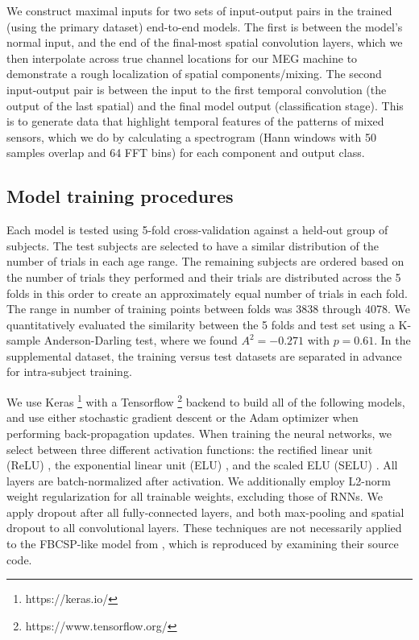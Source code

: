\documentclass[utf8]{frontiersSCNS} %
\begin{document}
We construct maximal inputs for two sets of input-output pairs in the trained (using the primary dataset) end-to-end models. The first is between the model's normal input, and the end of the final-most spatial convolution layers, which we then interpolate across true channel locations for our MEG machine to demonstrate a rough localization of spatial components/mixing. The second input-output pair is between the input to the first temporal convolution (the output of the last spatial) and the final model output (classification stage). This is to generate data that highlight temporal features of the patterns of mixed sensors, which we do by calculating a spectrogram (Hann windows with 50 samples overlap and 64 FFT bins) for each component and output class.

\subsection{Model training procedures} \label{sec:train_proc}

Each model is tested using 5-fold cross-validation against a held-out group of subjects. The test subjects are selected to have a similar distribution of the number of trials in each age range. The remaining subjects are ordered based on the number of trials they performed and their trials are distributed across the 5 folds in this order to create an approximately equal number of trials in each fold. The range in number of training points between folds was 3838 through 4078. We quantitatively evaluated the similarity between the 5 folds and test set using a K-sample Anderson-Darling test, where we found $A^2=-0.271$ with $p=0.61$. In the supplemental dataset, the training versus test datasets are separated in advance for intra-subject training.

We use Keras \footnote{https://keras.io/} with a Tensorflow \footnote{https://www.tensorflow.org/} backend to build all of the following models, and use either stochastic gradient descent or the Adam optimizer\cite{Kingma2015} when performing back-propagation updates. When training the neural networks, we select between three different activation functions: the rectified linear unit (ReLU) \cite{He2015a}, the exponential linear unit (ELU) \cite{Clevert}, and the scaled ELU (SELU) \cite{NIPS2017_6698}. All layers are batch-normalized \cite{Szegedy2015} after activation. We additionally employ L2-norm weight regularization for all trainable weights, excluding those of RNNs. We apply dropout \cite{Srivastava2014} after all fully-connected layers, and both max-pooling and spatial dropout \cite{Tompson2015} to all convolutional layers. These techniques are not necessarily applied to the FBCSP-like model from \cite{Schirrmeister2017}, which is reproduced by examining their source code.
\end{document}
